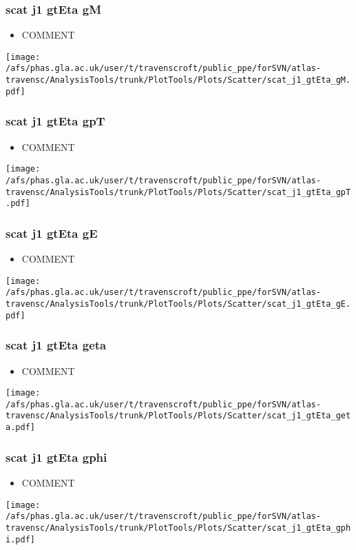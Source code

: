\documentclass{beamer}
\begin{document}
\begin{frame}
\frametitle{scat j1 gtEta gM}
\begin{itemize}
\item COMMENT
\end{itemize}
\begin{center}
\texttt{[image: /afs/phas.gla.ac.uk/user/t/travenscroft/public\_ppe/forSVN/atlas-travensc/AnalysisTools/trunk/PlotTools/Plots/Scatter/scat\_j1\_gtEta\_gM.pdf]}
\end{center}
\end{frame}

\begin{frame}
\frametitle{scat j1 gtEta gpT}
\begin{itemize}
\item COMMENT
\end{itemize}
\begin{center}
\texttt{[image: /afs/phas.gla.ac.uk/user/t/travenscroft/public\_ppe/forSVN/atlas-travensc/AnalysisTools/trunk/PlotTools/Plots/Scatter/scat\_j1\_gtEta\_gpT.pdf]}
\end{center}
\end{frame}

\begin{frame}
\frametitle{scat j1 gtEta gE}
\begin{itemize}
\item COMMENT
\end{itemize}
\begin{center}
\texttt{[image: /afs/phas.gla.ac.uk/user/t/travenscroft/public\_ppe/forSVN/atlas-travensc/AnalysisTools/trunk/PlotTools/Plots/Scatter/scat\_j1\_gtEta\_gE.pdf]}
\end{center}
\end{frame}

\begin{frame}
\frametitle{scat j1 gtEta geta}
\begin{itemize}
\item COMMENT
\end{itemize}
\begin{center}
\texttt{[image: /afs/phas.gla.ac.uk/user/t/travenscroft/public\_ppe/forSVN/atlas-travensc/AnalysisTools/trunk/PlotTools/Plots/Scatter/scat\_j1\_gtEta\_geta.pdf]}
\end{center}
\end{frame}

\begin{frame}
\frametitle{scat j1 gtEta gphi}
\begin{itemize}
\item COMMENT
\end{itemize}
\begin{center}
\texttt{[image: /afs/phas.gla.ac.uk/user/t/travenscroft/public\_ppe/forSVN/atlas-travensc/AnalysisTools/trunk/PlotTools/Plots/Scatter/scat\_j1\_gtEta\_gphi.pdf]}
\end{center}
\end{frame}
\end{document}

